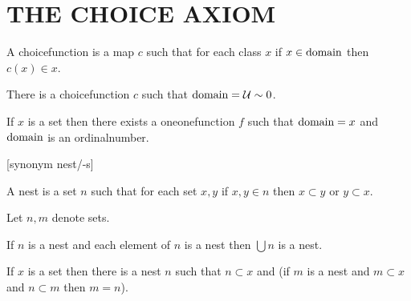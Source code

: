 \documentclass[a4paper,draft]{amsproc}
\begin{document}
\section{THE CHOICE AXIOM}
\begin{forthel}

\begin{definition}
A choicefunction is a map $c$ such that for each class $x$ if $x \in \domain c$ then $c(x) \in x$.
\end{definition}

\begin{axiom}[IX]
There is a choicefunction $c$ such that $\domain c = \cal{U} \sim 0$.
\end{axiom}

\begin{theorem}[140]
If $x$ is a set then there exists a oneonefunction $f$ such that $\domain f = x$ and $\domain f$ is an ordinalnumber.
\end{theorem}

[synonym nest/-s]
\begin{definition}[141]
A nest is a set $n$ such that for each set $x, y$ if $x, y \in n$ then $x \subset y$ or $y \subset x$.
\end{definition}

Let $n, m$ denote sets.
\begin{theorem}[142]
If $n$ is a nest and each element of $n$ is a nest then $\bigcup n$ is a nest.
\end{theorem}

\begin{theorem}[143]
If $x$ is a set then there is a nest $n$ such that $n \subset x$ and (if $m$ is a nest and $m \subset x$ and $n \subset m$ then $m = n$).
\end{theorem}

\end{forthel}
\end{document}
